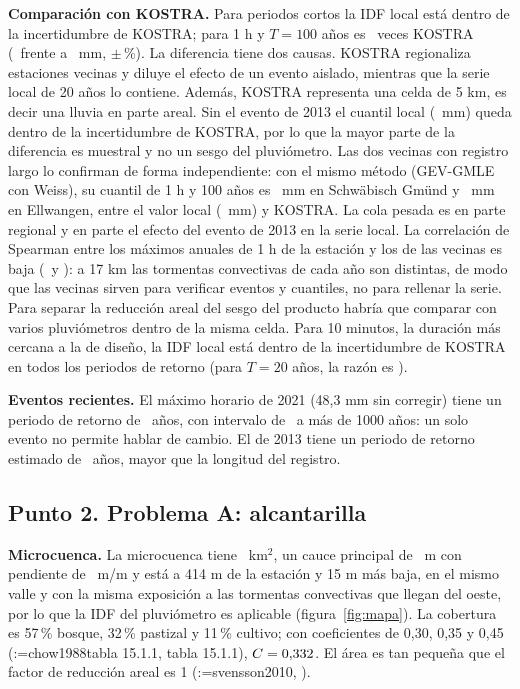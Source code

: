 \documentclass[12pt,a4paper]{article}
\makeatletter
\newcommand{\parencite}[2][]{(\@tempswafalse\@for\rk:=#2\do{\if@tempswa; \fi\@tempswatrue\csname rA@\rk\endcsname, \csname rY@\rk\endcsname}\ifx\relax#1\relax\else, #1\fi)}
\makeatother
\begin{document}
\textbf{Comparación con KOSTRA.} Para periodos cortos la IDF local está dentro de la incertidumbre de KOSTRA; para 1 h y $T=100$ años es \RazonHoraTcien\ veces KOSTRA (\QhoraTcien\ frente a \KosHoraTcien\ mm, $\pm$\KosUCHoraTcien\,\%). La diferencia tiene dos causas. KOSTRA regionaliza estaciones vecinas y diluye el efecto de un evento aislado, mientras que la serie local de 20 años lo contiene. Además, KOSTRA representa una celda de 5 km, es decir una lluvia en parte areal. Sin el evento de 2013 el cuantil local (\SinHoraTcien\ mm) queda dentro de la incertidumbre de KOSTRA, por lo que la mayor parte de la diferencia es muestral y no un sesgo del pluviómetro. Las dos vecinas con registro largo lo confirman de forma independiente: con el mismo método (GEV-GMLE con Weiss), su cuantil de 1 h y 100 años es \VecGmundQcien\ mm en Schwäbisch Gmünd y \VecEllwQcien\ mm en Ellwangen, entre el valor local (\VecPropQcien\ mm) y KOSTRA. La cola pesada es en parte regional y en parte el efecto del evento de 2013 en la serie local. La correlación de Spearman entre los máximos anuales de 1 h de la estación y los de las vecinas es baja (\VecRhoGmund\ y \VecRhoEllw): a 17 km las tormentas convectivas de cada año son distintas, de modo que las vecinas sirven para verificar eventos y cuantiles, no para rellenar la serie. Para separar la reducción areal del sesgo del producto habría que comparar con varios pluviómetros dentro de la misma celda. Para 10 minutos, la duración más cercana a la de diseño, la IDF local está dentro de la incertidumbre de KOSTRA en todos los periodos de retorno (para $T=20$ años, la razón es \RazonDiezTveinte).

\textbf{Eventos recientes.} El máximo horario de 2021 (48,3 mm sin corregir) tiene un periodo de retorno de \TeventoVeintiuno\ años, con intervalo de \TeventoVeintiunoLo\ a más de 1000 años: un solo evento no permite hablar de cambio. El de 2013 tiene un periodo de retorno estimado de \TeventoTrece\ años, mayor que la longitud del registro.

\subsection{Punto 2. Problema A: alcantarilla}

\textbf{Microcuenca.} La microcuenca tiene \AreaMicro\ km$^2$, un cauce principal de \LongCauce\ m con pendiente de \PendCauce\ m/m y está a 414 m de la estación y 15 m más baja, en el mismo valle y con la misma exposición a las tormentas convectivas que llegan del oeste, por lo que la IDF del pluviómetro es aplicable (figura~\ref{fig:mapa}). La cobertura es 57\,\% bosque, 32\,\% pastizal y 11\,\% cultivo; con coeficientes de 0,30, 0,35 y 0,45 \parencite[tabla 15.1.1]{chow1988}, $C=0{,}332$. El área es tan pequeña que el factor de reducción areal es 1 \parencite{svensson2010}.
\end{document}
